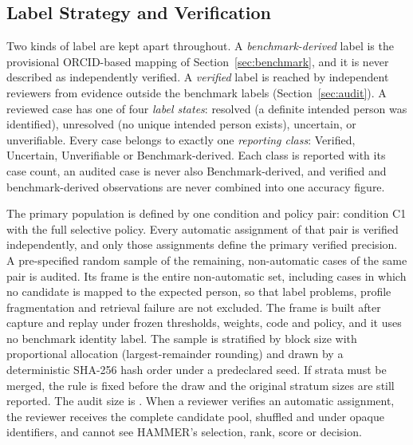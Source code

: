 \subsection{Label Strategy and Verification}
\label{sec:labels}
Two kinds of label are kept apart throughout. A \emph{benchmark-derived} label is the provisional ORCID-based mapping of Section~\ref{sec:benchmark}, and it is never described as independently verified. A \emph{verified} label is reached by independent reviewers from evidence outside the benchmark labels (Section~\ref{sec:audit}). A reviewed case has one of four \emph{label states}: resolved (a definite intended person was identified), unresolved (no unique intended person exists), uncertain, or unverifiable. Every case belongs to exactly one \emph{reporting class}: Verified, Uncertain, Unverifiable or Benchmark-derived. Each class is reported with its case count, an audited case is never also Benchmark-derived, and verified and benchmark-derived observations are never combined into one accuracy figure.

The primary population is defined by one condition and policy pair: condition C1 with the full selective policy. Every automatic assignment of that pair is verified independently, and only those assignments define the primary verified precision. A pre-specified random sample of the remaining, non-automatic cases of the same pair is audited. Its frame is the entire non-automatic set, including cases in which no candidate is mapped to the expected person, so that label problems, profile fragmentation and retrieval failure are not excluded. The frame is built after capture and replay under frozen thresholds, weights, code and policy, and it uses no benchmark identity label. The sample is stratified by block size with proportional allocation (largest-remainder rounding) and drawn by a deterministic SHA-256 hash order under a predeclared seed. If strata must be merged, the rule is fixed before the draw and the original stratum sizes are still reported. The audit size is . When a reviewer verifies an automatic assignment, the reviewer receives the complete candidate pool, shuffled and under opaque identifiers, and cannot see HAMMER's selection, rank, score or decision.

